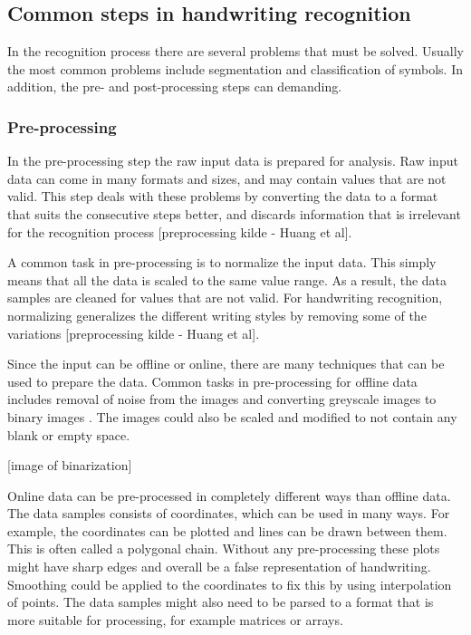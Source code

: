 \subsection{Common steps in handwriting recognition}

In the recognition process there are several problems that must be solved. Usually the most common problems include segmentation and classification of symbols. In addition, the pre- and post-processing steps can demanding.

\subsubsection{Pre-processing}

In the pre-processing step the raw input data is prepared for analysis. Raw input data can come in many formats and sizes, and may contain values that are not valid. This step deals with these problems by converting the data to a format that suits the consecutive steps better, and discards information that is irrelevant for the recognition process [preprocessing kilde - Huang et al].

A common task in pre-processing is to normalize the input data. This simply means that all the data is scaled to the same value range. As a result, the data samples are cleaned for values that are not valid. For handwriting recognition, normalizing generalizes the different writing styles by removing some of the variations [preprocessing kilde - Huang et al].

Since the input can be offline or online, there are many techniques that can be used to prepare the data. Common tasks in pre-processing for offline data includes removal of noise from the images and converting greyscale images to binary images \cite{priya_online_2016}. The images could also be scaled and modified to not contain any blank or empty space.

[image of binarization]

Online data can be pre-processed in completely different ways than offline data. The data samples consists of coordinates, which can be used in many ways. For example, the coordinates can be plotted and lines can be drawn between them. This is often called a polygonal chain. Without any pre-processing these plots might have sharp edges and overall be a false representation of handwriting. Smoothing could be applied to the coordinates to fix this by using interpolation of points. The data samples might also need to be parsed to a format that is more suitable for processing, for example matrices or arrays.

